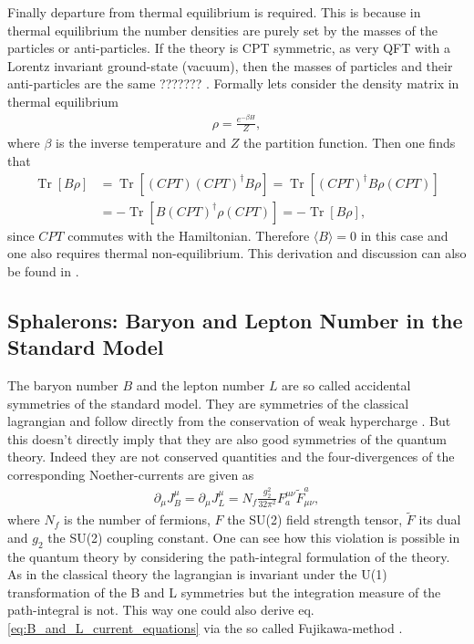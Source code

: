 \documentclass[13pt,a4paper,titlepage]{article}
\newcommand{\Tr}{\operatorname{Tr}}
\begin{document}
Finally departure from thermal equilibrium is required. This is because in thermal equilibrium the number densities are purely set by the
masses of the particles or anti-particles. If the theory is CPT symmetric, as very QFT with a Lorentz invariant ground-state (vacuum), then the
masses of particles and their anti-particles are the same ??????? .
Formally lets consider the density matrix in thermal equilibrium
\begin{align}
    \rho = \frac{e^{- \beta H}}{Z},
\end{align}
where $\beta$ is the inverse temperature and $Z$ the partition function.
Then one finds that
\begin{align}
    \Tr [ B \rho ] &=  \Tr [ (CPT) (CPT)^\dagger B \rho ] = \Tr [ (CPT)^\dagger B \rho (CPT) ]  \\
                   &= - \Tr [ B (CPT)^\dagger \rho (CPT) ] = - \Tr [ B \rho ],
\end{align}
since $CPT$ commutes with the Hamiltonian. Therefore $\langle B \rangle = 0$ in this case and one also requires thermal non-equilibrium. This derivation and discussion can also be found in \cite[sec. II]{Trodden:2004mj_baryogenesis_and_leptogenesis}.


\subsection{Sphalerons: Baryon and Lepton Number in the Standard Model}
\label{sec:sphaelrons}

The baryon number $B$ and the lepton number $L$ are so called accidental
symmetries of the standard model. They are symmetries of the classical lagrangian
and follow directly from the conservation of weak hypercharge \cite[part II.B]{Trodden:2004mj_baryogenesis_and_leptogenesis}.
But this doesn't directly imply that they are also good symmetries of the
quantum theory. Indeed they are not conserved quantities and the four-divergences
of the corresponding Noether-currents are given as \cite[eq. 2.1]{Cline:2006ts_Baryogenesis}
\begin{align}
    \label{eq:B_and_L_current_equations}
    \partial_\mu J^\mu_B = \partial_\mu J^\mu_L = N_f \frac{g_2^2}{32 \pi^2} F^{\mu \nu}_a \tilde{F}_{\mu \nu}^a,
\end{align}
where $N_f$ is the number of fermions, $F$ the SU(2) field strength tensor, $\tilde{F}$ its dual and $g_2$ the SU(2) coupling constant.
One can see how this violation is possible in the quantum theory by considering the path-integral formulation of the theory.
As in the classical theory the lagrangian is invariant under the U(1) transformation of the B and L symmetries but the integration measure of the path-integral is not. This way one could also derive eq. \eqref{eq:B_and_L_current_equations} via the so called Fujikawa-method \cite{Fujikawa_method_PhysRevD.21.2848}.
\end{document}
